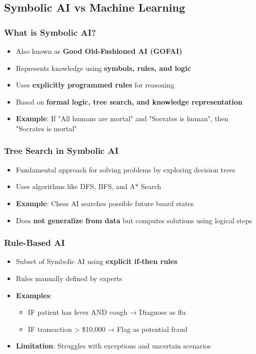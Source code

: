\subsection{Symbolic AI vs Machine Learning}

\subsubsection{What is Symbolic AI?}

\begin{itemize}
\item Also known as \textbf{Good Old-Fashioned AI (GOFAI)}
\item Represents knowledge using \textbf{symbols, rules, and logic}
\item Uses \textbf{explicitly programmed rules} for reasoning
\item Based on \textbf{formal logic, tree search, and knowledge representation}
\item \textbf{Example}: If "All humans are mortal" and "Socrates is human", then "Socrates is mortal"
\end{itemize}

\subsubsection{Tree Search in Symbolic AI}

\begin{itemize}
\item Fundamental approach for solving problems by exploring decision trees
\item Uses algorithms like DFS, BFS, and A* Search
\item \textbf{Example}: Chess AI searches possible future board states
\item Does \textbf{not generalize from data} but computes solutions using logical steps
\end{itemize}

\subsubsection{Rule-Based AI}

\begin{itemize}
\item Subset of Symbolic AI using \textbf{explicit if-then rules}
\item Rules manually defined by experts
\item \textbf{Examples}:
\begin{itemize}
\item IF patient has fever AND cough → Diagnose as flu
\item IF transaction > \$10,000 → Flag as potential fraud
\end{itemize}
\item \textbf{Limitation}: Struggles with exceptions and uncertain scenarios
\end{itemize}

